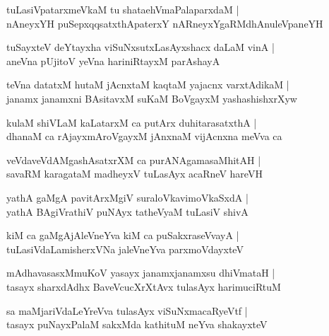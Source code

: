\documentclass[twoside,12pt,openright]{book}
\newcounter{shloka}[chapter]
\begin{document}
\begin{shloka}%
tuLasiVpatarxmeVkaM tu shataehVmaPalaparxdaM |\\
nAneyxYH puSepxqqsatxthApaterxY nARneyxYgaRMdhAnuleVpaneYH 
\end{shloka}

\begin{shloka}%
tuSayxteV deYtayxha viSuNxsutxLasAyxshacx daLaM vinA |\\
aneVna pUjitoV yeVna hariniRtayxM parAshayA 
\end{shloka}

\begin{shloka}%
teVna datatxM hutaM jAcnxtaM kaqtaM yajacnx varxtAdikaM |\\
janamx janamxni BAsitavxM suKaM BoVgayxM yashashishxrXyw
\end{shloka}

\begin{shloka}%
kulaM shiVLaM kaLatarxM ca putArx duhitarasatxthA |\\
dhanaM ca rAjayxmAroVgayxM jAnxnaM vijAcnxna meVva ca
\end{shloka}

\begin{shloka}%
veVdaveVdAMgashAsatxrXM ca purANAgamasaMhitAH |\\
savaRM karagataM madheyxV tuLasAyx acaRneV hareVH 
\end{shloka}

\begin{shloka}%
yathA gaMgA pavitArxMgiV suraloVkavimoVkaSxdA |\\
yathA BAgiVrathiV puNAyx tatheVyaM tuLasiV shivA 
\end{shloka}

\begin{shloka}%
kiM ca gaMgAjAleVneYva kiM ca puSakxraseVvayA |\\
tuLasiVdaLamisherxVNa jaleVneYva parxmoVdayxteV 
\end{shloka}

\begin{shloka}%
mAdhavasasxMmuKoV yasayx janamxjanamxsu dhiVmataH |\\
tasayx sharxdAdhx BaveVcucXrXtAvx tulasAyx harimuciRtuM 
\end{shloka}

\begin{shloka}%
sa maMjariVdaLeYreVva tulasAyx viSuNxmacaRyeVtf |\\
tasayx puNayxPalaM sakxMda kathituM neYva shakayxteV 
\end{shloka}
\end{document}
